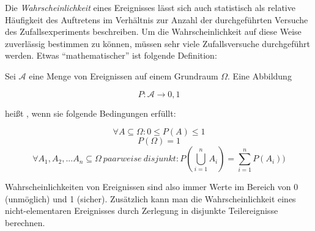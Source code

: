 Die \emph{Wahrscheinlichkeit} eines Ereignisses lässt sich auch statistisch als
relative Häufigkeit des Auftretens im Verhältnis zur Anzahl der durchgeführten
Versuche des Zufallsexperiments beschreiben. Um die Wahrscheinlichkeit auf diese
Weise zuverlässig bestimmen zu können, müssen sehr viele Zufallsversuche
durchgeführt werden. Etwas "`mathematischer"' ist folgende Definition:

\begin{definition}[Wahrscheinlichkeit]
Sei $\mathcal{A}$ eine Menge von Ereignissen auf einem Grundraum $\Omega$. Eine
Abbildung

\[ P: \mathcal{A} \to 0,1 \]

heißt , wenn sie folgende Bedingungen erfüllt:

\[\forall A \subseteq \Omega: 0 \leq P(A) \leq 1\]
\[P(\Omega) = 1\]
\[\forall A_1, A_2, ... A_n \subseteq \Omega\ paarweise\ disjunkt:
P(\bigcup_{i=1}^{n} A_i) = \sum_{i=1}^{n}P(A_i))\]
\end{definition}

Wahrscheinlichkeiten von Ereignissen sind also immer Werte im Bereich von 0
(unmöglich) und 1 (sicher). Zusätzlich kann man die Wahrscheinlichkeit eines
nicht-elementaren Ereignisses durch Zerlegung in disjunkte Teilereignisse
berechnen.
